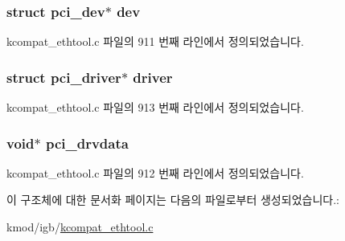 \subsubsection[{\texorpdfstring{dev}{dev}}]{\setlength{\rightskip}{0pt plus 5cm}struct pci\+\_\+dev$\ast$ dev}\hypertarget{struct__kc__pci__dev__ext_aeb91c60cf706205b37cdd63dc6040761}{}\label{struct__kc__pci__dev__ext_aeb91c60cf706205b37cdd63dc6040761}


kcompat\+\_\+ethtool.\+c 파일의 911 번째 라인에서 정의되었습니다.

\subsubsection[{\texorpdfstring{driver}{driver}}]{\setlength{\rightskip}{0pt plus 5cm}struct pci\+\_\+driver$\ast$ driver}\hypertarget{struct__kc__pci__dev__ext_a93401bc2e859d98a2ad917c66dfbb23e}{}\label{struct__kc__pci__dev__ext_a93401bc2e859d98a2ad917c66dfbb23e}


kcompat\+\_\+ethtool.\+c 파일의 913 번째 라인에서 정의되었습니다.

\subsubsection[{\texorpdfstring{pci\+\_\+drvdata}{pci_drvdata}}]{\setlength{\rightskip}{0pt plus 5cm}void$\ast$ pci\+\_\+drvdata}\hypertarget{struct__kc__pci__dev__ext_a1612d616f91a828470e89832c172a6ff}{}\label{struct__kc__pci__dev__ext_a1612d616f91a828470e89832c172a6ff}


kcompat\+\_\+ethtool.\+c 파일의 912 번째 라인에서 정의되었습니다.



이 구조체에 대한 문서화 페이지는 다음의 파일로부터 생성되었습니다.\+:\begin{DoxyCompactItemize}
\item 
kmod/igb/\hyperlink{kcompat__ethtool_8c}{kcompat\+\_\+ethtool.\+c}\end{DoxyCompactItemize}
